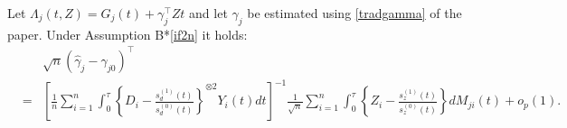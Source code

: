 \documentclass[11pt]{article}
\newcommand{\eqnn}{\begin{eqnarray*}}
\newcommand{\een}{\end{eqnarray*}}
\begin{document}
\begin{lemmas}\label{ifQ21aab}
Let $\Lambda_j(t,Z)=G_j(t) + \gamma_j^{\top} Z t$ and let  $ \gamma_j$ be estimated using \eqref{tradgamma} of the paper.
Under Assumption B*\ref{if2n} it holds:
\eqnn
&&\sqrt{n}(\hat\gamma_j-\gamma_{j0})^\top\\
&=&\left[\frac{1}{n}\sum_{i=1}^n\int_0^{\tau}\left\{D_i-\frac{s_d^{(1)}(t)}{s_d^{(0)}(t)}\right\}^{\otimes 2}Y_i(t)dt\right]^{-1}\frac{1}{\sqrt{n}}\sum_{i=1}^n
\int_0^\tau \left\{Z_i-\frac{s_z^{(1)}(t)}{s_z^{(0)}(t)}\right\}dM_{ji}(t)+o_p(1).\nonumber\\
\een
\end{lemmas}

\newenvironment{newproof15}{\begin{proof}\textsc{\emph{of Lemma \ref{ifQ21aab}.}}}{\end{proof}}
\end{document}
